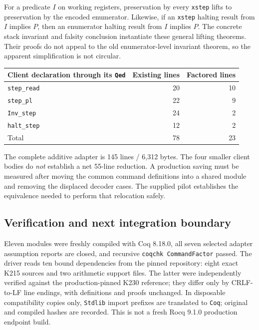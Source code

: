 \documentclass[11pt,letterpaper]{article}
\theoremstyle{definition}\newtheorem{definition}[theorem]{Definition}
\newcommand{\code}[1]{\texttt{#1}}
\begin{document}
For a predicate $I$ on working registers, preservation by every \code{xstep}
lifts to preservation by the encoded enumerator. Likewise, if an \code{xstep}
halting result from $I$ implies $P$, then an enumerator halting result from $I$
implies $P$. The concrete stack invariant and falsity conclusion instantiate
these general lifting theorems. Their proofs do not appeal to the old
enumerator-level invariant theorem, so the apparent simplification is not circular.

\begin{center}\small
\begin{tabular}{lrr}
\toprule
Client declaration through its \code{Qed} & Existing lines & Factored lines \\
\midrule
\code{step\_read} & 20 & 10 \\
\code{step\_pl} & 22 & 9 \\
\code{Inv\_step} & 24 & 2 \\
\code{halt\_step} & 12 & 2 \\
\midrule
Total & 78 & 23 \\
\bottomrule
\end{tabular}
\end{center}

The complete additive adapter is 145 lines / 6,312 bytes. The four smaller client
bodies do \emph{not} establish a net 55-line reduction. A production saving must be
measured after moving the common command definitions into a shared module and
removing the displaced decoder cases. The supplied pilot establishes the
equivalence needed to perform that relocation safely.

\subsection{Verification and next integration boundary}

Eleven modules were freshly compiled with Coq 8.18.0, all seven selected adapter
assumption reports are closed, and recursive \code{coqchk CommandFactor} passed.
The driver reads ten bound dependencies from the pinned repository: eight exact
K215 sources and two arithmetic support files. The latter were independently
verified against the production-pinned K230 reference; they differ only by
CRLF-to-LF line endings, with definitions and proofs unchanged. In disposable
compatibility copies only, \code{Stdlib} import prefixes are translated to
\code{Coq}; original and compiled hashes are recorded. This is not a fresh Rocq
9.1.0 production endpoint build.
\end{document}
